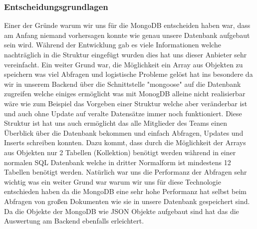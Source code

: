		\subsubsection{Entscheidungsgrundlagen}
			Einer der Gründe warum wir uns für die MongoDB entscheiden haben war, dass am Anfang niemand vorhersagen konnte wie genau unsere Datenbank aufgebaut sein wird. 
			Während der Entwicklung gab es viele Informationen welche nachträglich in die Struktur eingefügt wurden dies hat uns dieser Anbieter sehr vereinfacht. 
			Ein weiter Grund war, die Möglichkeit ein Array aus Objekten zu speichern was viel Abfragen und logistische Probleme gelöst hat ins besondere da wir in unserem Backend über die Schnittstelle "mongoose" auf 
			die Datenbank zugreifen welche einiges ermöglicht was mit MonogDB alleine nicht realisierbar wäre wie zum Beispiel das Vorgeben einer Struktur welche aber veränderbar ist und auch ohne Update auf veralte Datensätze immer noch funktioniert. 
			Diese Struktur ist hat uns auch ermöglicht das alle Mitglieder des Teams einen Überblick über die Datenbank bekommen und einfach Abfragen, Updates und Inserts schreiben konnten. 
			Dazu kommt, dass durch die Möglichkeit der Arrays aus Objekten nur 2 Tabellen (Kollektion) benötigt werden während in einer normalen SQL Datenbank welche in dritter Normalform ist mindestens 12 Tabellen benötigt werden. 
			Natürlich war uns die Performanz der Abfragen sehr wichtig was ein weiter Grund war warum wir uns für diese Technologie entschieden haben da die MongoDB eine sehr hohe Performanz hat selbst beim Abfragen von großen Dokumenten wie sie in unsere Datenbank gespeichert sind. 
			Da die Objekte der MongoDB wie JSON Objekte aufgebaut sind hat das die Auswertung am Backend ebenfalls erleichtert.

\newpage